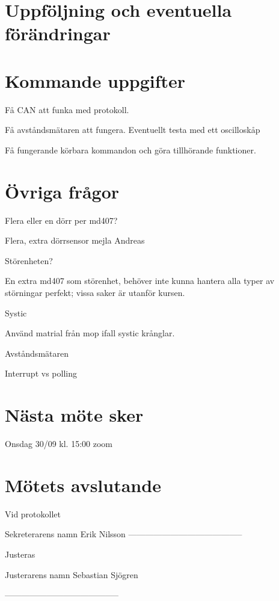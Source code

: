\documentclass[a4paper]{article}
\begin{document}
\section{Uppföljning och eventuella förändringar}
\label{sec:uppf}





\section{Kommande uppgifter}
\label{sec:komm}
Få CAN att funka med protokoll.

Få avståndsmätaren att fungera. Eventuellt testa med ett oscilloskåp

Få fungerande körbara kommandon och göra tillhörande funktioner.

\section{Övriga frågor}
\label{sec:övr}
Flera eller en dörr per md407?

Flera, extra dörrsensor mejla Andreas
\newline \newline

 

Störenheten?

En extra md407 som störenhet, behöver inte kunna hantera alla typer av störningar perfekt; vissa saker är utanför kursen.
\newline \newline


Systic

Använd matrial från mop ifall systic krånglar.
\newline \newline

 

Avståndsmätaren

Interrupt vs polling

\section{Nästa möte sker}
\label{sec:övr}
Onsdag 30/09 kl. 15:00 zoom

\section{Mötets avslutande}
\label{sec:övr}



Vid protokollet

Sekreterarens namn
Erik Nilsson
-----------------------------------------



Justeras


Justerarens namn
Sebastian Sjögren

-----------------------------------------
\end{document}
